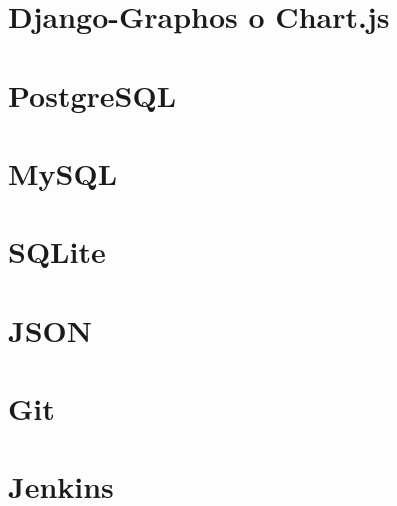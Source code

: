 \section{Django-Graphos o Chart.js}
\section{PostgreSQL}
\section{MySQL}
\section{SQLite}
\section{JSON}

\section{Git}

\section{Jenkins}


